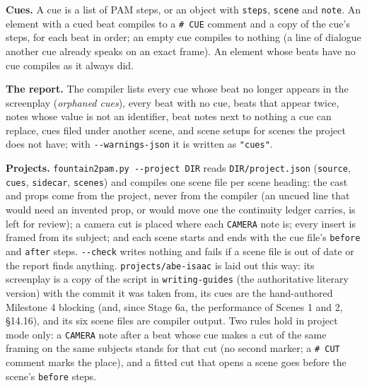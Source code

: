 \documentclass[
  12pt,
  letterpaper,
]{book}
\begin{document}
\textbf{Cues.} A cue is a list of PAM steps, or an object with
\texttt{steps}, \texttt{scene} and \texttt{note}. An element with a
cued beat compiles to a \texttt{\# CUE} comment and a copy of the cue's
steps, for each beat in order; an empty cue compiles to nothing (a line
of dialogue another cue already speaks on an exact frame). An element
whose beats have no cue compiles as it always did.

\textbf{The report.} The compiler lists every cue whose beat no longer
appears in the screenplay (\emph{orphaned cues}), every beat with no cue,
beats that appear twice, notes whose value is not an identifier, beat
notes next to nothing a cue can replace, cues filed under another scene,
and scene setups for scenes the project does not have; with
\texttt{-{}-warnings-json} it is written as \texttt{"cues"}.

\textbf{Projects.} \texttt{fountain2pam.py -{}-project DIR} reads
\texttt{DIR/project.json} (\texttt{source}, \texttt{cues},
\texttt{sidecar}, \texttt{scenes}) and compiles one scene file per scene
heading: the cast and props come from the project, never from the
compiler (an uncued line that would need an invented prop, or would move
one the continuity ledger carries, is left for review); a camera cut is
placed where each \texttt{CAMERA} note is; every insert is framed from
its subject; and each scene starts and ends with the cue file's
\texttt{before} and \texttt{after} steps. \texttt{-{}-check} writes
nothing and fails if a scene file is out of date or the report finds
anything. \texttt{projects/abe-isaac} is laid out this way: its
screenplay is a copy of the script in \texttt{writing-guides} (the
authoritative literary version) with the commit it was taken from, its
cues are the hand-authored Milestone 4 blocking (and, since Stage 6a,
the performance of Scenes 1 and 2, \S14.16), and its six scene
files are compiler output. Two rules hold in project mode only: a
\texttt{CAMERA} note after a beat whose cue makes a cut of the same
framing on the same subjects stands for that cut (no second marker; a
\texttt{\# CUT} comment marks the place), and a fitted cut that opens a
scene goes before the scene's \texttt{before} steps.
\end{document}
